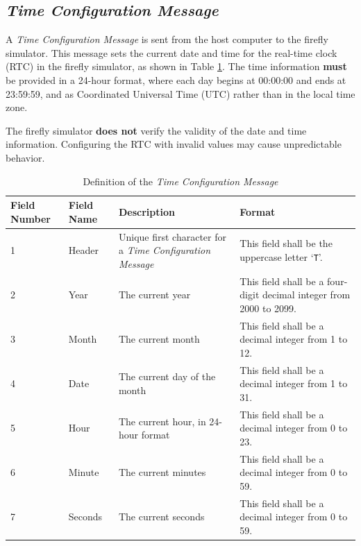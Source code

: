 \documentclass[letterpaper,11pt]{article}
\begin{document}
\subsection{\textit{Time Configuration Message}}

A \textit{Time Configuration Message} is sent from the host computer to the
firefly simulator. This message sets the current date and time for the
real-time clock (RTC) in the firefly simulator, as shown in Table
\ref{tab:TimeConfig}. The time information \textbf{must} be provided
in a 24-hour format, where each day begins at 00:00:00 and ends at 23:59:59,
and as Coordinated Universal Time (UTC) rather than in the local time zone.

The firefly simulator \textbf{does not} verify the validity of the date and
time information. Configuring the RTC with invalid values may cause
unpredictable behavior.

\begin{table}[H]
\centering
\caption{Definition of the \textit{Time Configuration Message}}
\label{tab:TimeConfig}
\setlength\extrarowheight{2pt}
\begin{tabular}[h]{|p{0.5in}|p{1.00in}|p{2.25in}|p{2.25in}|} \hline
Field Number & Field Name & Description & Format \\ \hline
1            & Header
             & Unique first character for a \textit{Time Configuration
             Message}
             & This field shall be the uppercase letter `\texttt{T}'.
             \\ \hline
2            & Year
             & The current year
             & This field shall be a four-digit decimal integer from 2000 to
             2099.
             \\ \hline
3            & Month
             & The current month
             & This field shall be a decimal integer from 1 to 12.
             \\ \hline
4            & Date
             & The current day of the month
             & This field shall be a decimal integer from 1 to 31.
             \\ \hline
5            & Hour
             & The current hour, in 24-hour format
             & This field shall be a decimal integer from 0 to 23.
             \\ \hline
6            & Minute
             & The current minutes
             & This field shall be a decimal integer from 0 to 59.
             \\ \hline
7            & Seconds
             & The current seconds
             & This field shall be a decimal integer from 0 to 59.
             \\ \hline
\end{tabular}
\end{table}
\end{document}
